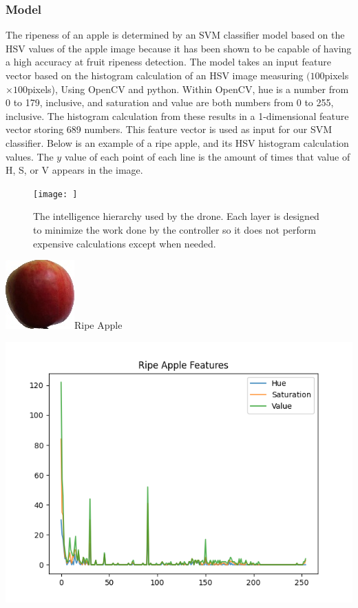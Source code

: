 \subsubsection{Model}
The ripeness of an apple is determined by an SVM classifier model based on the HSV values of the apple image because it has been shown to be capable of having a high accuracy at fruit ripeness detection\cite{HSVRipeness}.
The model takes an input feature vector based on the histogram calculation of an HSV image measuring $(100$pixels$\times100$pixels), Using OpenCV and python.
Within OpenCV, hue is a number from 0 to 179, inclusive, and saturation and value are both numbers from 0 to 255, inclusive.
The histogram calculation from these results in a 1-dimensional feature vector storing 689 numbers. 
This feature vector is used as input for our SVM classifier. Below is an example of a ripe apple, and its HSV histogram calculation values. The $y$ value of each point of each line is the amount of times that value of H, S, or V appears in the image.\\
\begin{figure}[!htb]
    \fontsize{7}{5}\selectfont
    \centering
    \texttt{[image: ]}
    \caption{
        The intelligence hierarchy used by the drone.
        Each layer is designed to minimize the work done by the controller so it does not perform expensive calculations except when needed.
    }
    \label{fig:intelligence-hierarchy}
\end{figure}
\begin{center}
\includegraphics[scale=1]{figures/Ripe Apple Example.jpg}Ripe Apple\\
\end{center}
\includegraphics[scale=.5]{figures/ripeness_features.png}

